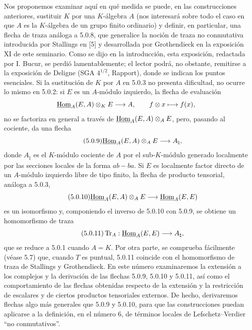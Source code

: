 Nos proponemos examinar aquí en qué medida se puede, en las construcciones anteriores, sustituir $K$ por una $K$-álgebra $A$ (nos interesará sobre todo el caso en que $A$ es la $K$-álgebra de un grupo finito ordinario) y definir, en particular, una flecha de traza análoga a 5.0.8, que generalice la noción de traza no conmutativa introducida por Stallings en [5] y desarrollada por Grothendieck en la exposición XI de este seminario. Como se dijo en la introducción, esta exposición, redactada por I. Bucur, se perdió lamentablemente; el lector podrá, no obstante, remitirse a la exposición de Deligne (SGA $4^{1/2}$, Rapport), donde se indican los puntos esenciales. Si la sustitución de $K$ por $A$ en 5.0.3 no presenta dificultad, no ocurre lo mismo en 5.0.2: si $E$ es un $A$-módulo izquierdo, la flecha de evaluación
\[
\underline{\operatorname{Hom}}_A(E,A)\otimes_KE\longrightarrow A,
\qquad f\otimes x\longmapsto f(x),
\]
no se factoriza en general a través de $\underline{\operatorname{Hom}}_A(E,A)\otimes_AE$, pero, pasando al cociente, da una flecha
\begin{equation}\tag{5.0.9}
\underline{\operatorname{Hom}}_A(E,A)\otimes_AE\longrightarrow A_\natural,
\end{equation}
donde $A_\natural$ es el $K$-módulo cociente de $A$ por el sub-$K$-módulo generado localmente por las secciones locales de la forma $ab-ba$. Si $E$ es localmente factor directo de un $A$-módulo izquierdo libre de tipo finito, la flecha de producto tensorial, análoga a 5.0.3,
\begin{equation}\tag{5.0.10}
\underline{\operatorname{Hom}}_A(E,A)\otimes_AE\longrightarrow\underline{\operatorname{Hom}}_A(E,E)
\end{equation}
es un isomorfismo y, componiendo el inverso de 5.0.10 con 5.0.9, se obtiene un homomorfismo de traza
\begin{equation}\tag{5.0.11}
\operatorname{Tr}_A:\underline{\operatorname{Hom}}_A(E,E)\longrightarrow A_\natural,
\end{equation}
que se reduce a 5.0.1 cuando $A=K$. Por otra parte, se comprueba fácilmente (véase 5.7) que, cuando $T$ es puntual, 5.0.11 coincide con el homomorfismo de traza de Stallings y Grothendieck. En este número examinaremos la extensión a los complejos y la derivación de las flechas 5.0.9, 5.0.10 y 5.0.11, así como el comportamiento de las flechas obtenidas respecto de la extensión y la restricción de escalares y de ciertos productos tensoriales externos. De hecho, derivaremos flechas algo más generales que 5.0.9 y 5.0.10, para que las construcciones puedan aplicarse a la definición, en el número 6, de términos locales de Lefschetz--Verdier ``no conmutativos''.

